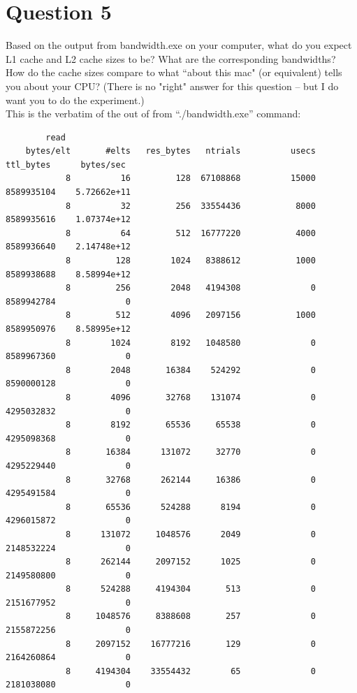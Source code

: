 \documentclass[]{article}
\begin{document}
\section*{Question 5}
    Based on the output from bandwidth.exe on your computer, what do you expect L1 cache and L2 cache sizes to be?  What are the corresponding bandwidths?   How do the cache sizes compare to what ``about this mac" (or equivalent) tells you about your CPU?  (There is no "right" answer for this question -- but I do want you to do the experiment.)
    \\[1.1em]
    This is the verbatim of the out of from ``./bandwidth.exe'' command: 
    \begin{lstlisting}
        read        
    bytes/elt       #elts   res_bytes   ntrials          usecs      ttl_bytes      bytes/sec
            8          16         128  67108868          15000     8589935104    5.72662e+11
            8          32         256  33554436           8000     8589935616    1.07374e+12
            8          64         512  16777220           4000     8589936640    2.14748e+12
            8         128        1024   8388612           1000     8589938688    8.58994e+12
            8         256        2048   4194308              0     8589942784              0
            8         512        4096   2097156           1000     8589950976    8.58995e+12
            8        1024        8192   1048580              0     8589967360              0
            8        2048       16384    524292              0     8590000128              0
            8        4096       32768    131074              0     4295032832              0
            8        8192       65536     65538              0     4295098368              0
            8       16384      131072     32770              0     4295229440              0
            8       32768      262144     16386              0     4295491584              0
            8       65536      524288      8194              0     4296015872              0
            8      131072     1048576      2049              0     2148532224              0
            8      262144     2097152      1025              0     2149580800              0
            8      524288     4194304       513              0     2151677952              0
            8     1048576     8388608       257              0     2155872256              0
            8     2097152    16777216       129              0     2164260864              0
            8     4194304    33554432        65              0     2181038080              0

\end{lstlisting}
\end{document}
